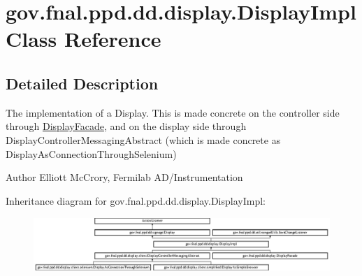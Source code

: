 \hypertarget{classgov_1_1fnal_1_1ppd_1_1dd_1_1display_1_1DisplayImpl}{\section{gov.\-fnal.\-ppd.\-dd.\-display.\-Display\-Impl Class Reference}
\label{classgov_1_1fnal_1_1ppd_1_1dd_1_1display_1_1DisplayImpl}
}


\subsection{Detailed Description}
The implementation of a Display. This is made concrete on the controller side through \hyperlink{classgov_1_1fnal_1_1ppd_1_1dd_1_1display_1_1DisplayFacade}{Display\-Facade}, and on the display side through Display\-Controller\-Messaging\-Abstract (which is made concrete as Display\-As\-Connection\-Through\-Selenium)

\begin{DoxyAuthor}{Author}
Elliott Mc\-Crory, Fermilab A\-D/\-Instrumentation 
\end{DoxyAuthor}
Inheritance diagram for gov.\-fnal.\-ppd.\-dd.\-display.\-Display\-Impl\-:\begin{figure}[H]
\begin{center}
\leavevmode
\includegraphics[height=2.015839cm]{classgov_1_1fnal_1_1ppd_1_1dd_1_1display_1_1DisplayImpl}
\end{center}
\end{figure}
